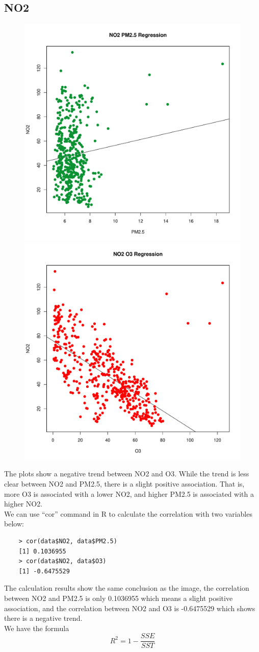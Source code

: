 \documentclass[a4paper,12pt,reqno]{report}
\begin{document}
\subsection{NO2}
\begin{figure}[H]
    \centering
    \vspace{-0.35cm}
    \includegraphics[width=0.4\linewidth]{figures/NO2_PM25_Regression.pdf}
    \includegraphics[width=0.4\linewidth]{figures/NO2_O3_Regression.pdf}
\end{figure}
The plots show a negative trend between NO2 and O3. While the trend is less clear between NO2 and PM2.5, there is a slight positive association.
That is, more O3 is associated with a lower NO2, and higher PM2.5 is associated with a higher NO2.
\\
We can use ``cor'' command in R to calculate the correlation with two variables below:
\begin{lstlisting}
    > cor(data$NO2, data$PM2.5)
    [1] 0.1036955
    > cor(data$NO2, data$O3)   
    [1] -0.6475529
\end{lstlisting}
The calculation results show the same conclusion as the image, 
the correlation between NO2 and PM2.5 is only 0.1036955 which means a slight positive association, 
and the correlation between NO2 and O3 is -0.6475529 which shows there is a negative trend.
\\
We have the formula
\begin{equation}
    R^2=1-\frac{SSE}{SST}
\end{equation}
\end{document}

